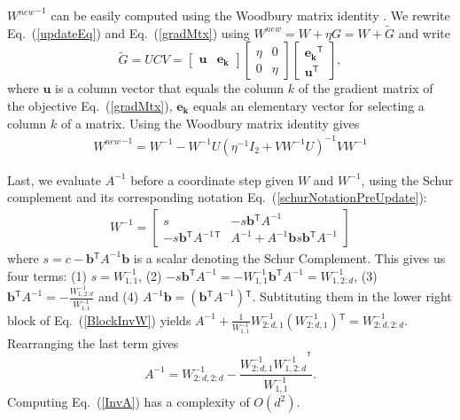 \documentclass{article} %
\newcommand\mat[1]{{#1}}
\renewcommand\vec[1]{\mathbf{#1}}
\newcommand{\T}{{}^\mathsf{T}}
\newcommand{\W}{\mat{W}}
\newcommand{\newW}{{\mat{W^{new}}}}
\newcommand{\B}{\vec{b}}
\newcommand{\C}{c}
\newcommand{\invA}{A^{-1}}
\renewcommand{\eqref}[1]{Eq.~(\ref{#1})}
\begin{document}
$\newW^{-1}$ can be easily computed using the Woodbury matrix
identity \cite{woodbury1950inverting}. We rewrite \eqref{updateEq} and \eqref{gradMtx} using $\newW = \W + \eta G = \W+\mat{\widetilde{G}}$
and write
\begin{equation}
  \mat{\widetilde{G}} = \mat{U}\mat{C}\mat{V} = \left[ \begin{matrix}
      \vec{u} & \vec{e_k} \end{matrix} \right] \left[ \begin{matrix}
      \eta & 0 \\ 0 & \eta \end{matrix} \right] \left[ \begin{matrix}
      \vec{e_k}\T \\ \vec{u}\T \end{matrix} \right],
  \label{gradMtxWDB}
\end{equation}
where $\vec{u}$ is a column vector that equals the column $k$ of the gradient matrix of the objective \eqref{gradMtx},
$\vec{e_k}$ equals an elementary vector for selecting a column $k$ of
a matrix. 
Using the Woodbury matrix identity gives 
\begin{equation}
    \begin{array}{lcl}
    \newW^{-1} = 
    \W^{-1} - \W^{-1} \mat{U} (\eta^{-1} I_2 + \mat{V}     \W^{-1} \mat{U})^{-1} \mat{V} \W^{-1}
    \end{array}
    \label{InvWwdb}
\end{equation}

Last, we evaluate $\invA$ before a coordinate step given $\W$
and $\W^{-1}$, using the Schur complement and its corresponding
notation \eqref{schurNotationPreUpdate}:
\begin{equation}
\begin{array}{l}
 \W^{-1} \!\!=\!\! 
 \left[ \begin{array}{cc} s & -s \B\T \invA \\ -s \B\T \invA\T &  \invA \!+ \!\invA \B s \B\T \invA  \end{array}  \right]
\end{array}
\label{BlockInvW}
\end{equation}
where $s= \C-\B\T \invA \B$ is a scalar denoting the Schur Complement. This gives us four terms: (1) $s = \W^{-1}_{1,1}$, (2)
$  -s \B\T \invA = -\W^{-1}_{1,1} \B\T \invA = \W^{-1}_{1,2:d}$, (3) $\B\T \invA = -\frac{\W^{-1}_{1,2:d}}{\W^{-1}_{1,1} }$ and (4) $\invA\B = (\B\T \invA)\T$. Subtituting them in the lower right block of \eqref{BlockInvW} yields $\invA + \frac{1}{\W^{-1}_{1,1} } \W^{-1}_{2:d,1} (\W^{-1}_{2:d,1})\T = \W^{-1}_{2:d,2:d}$. Rearranging the last term gives
\begin{equation}
  \invA = \W^{-1}_{2:d,2:d}- \frac{\W^{-1}_{2:d,1} {\W^{-1}_{1,2:d}}^{\T}}{\W^{-1}_{1,1}}. 
  \label{InvA}
\end{equation}
Computing \eqref{InvA} has a complexity of $O(d^2)$.
\end{document}
